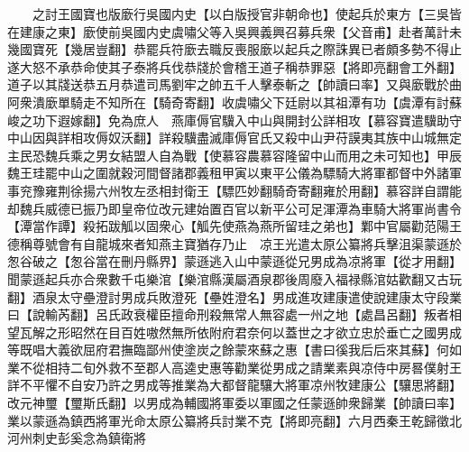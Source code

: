 　　之討王國寶也版廞行吳國内史【以白版授官非朝命也】使起兵於東方【三吳皆在建康之東】廞使前吳國内史虞嘯父等入吳興義興召募兵衆【父音甫】赴者萬計未幾國寶死【幾居豈翻】恭罷兵符廞去職反喪服廞以起兵之際誅異已者頗多勢不得止遂大怒不承恭命使其子泰將兵伐恭牋於會稽王道子稱恭罪惡【將即亮翻會工外翻】道子以其牋送恭五月恭遣司馬劉牢之帥五千人擊泰斬之【帥讀曰率】又與廞戰於曲阿衆潰廞單騎走不知所在【騎奇寄翻】收虞嘯父下廷尉以其祖潭有功【虞潭有討蘇峻之功下遐嫁翻】免為庶人　燕庫傉官驥入中山與開封公詳相攻【慕容寶遣驥助守中山因與詳相攻傉奴沃翻】詳殺驥盡滅庫傉官氏又殺中山尹苻謨夷其族中山城無定主民恐魏兵乘之男女結盟人自為戰【使慕容農慕容隆留中山而用之未可知也】甲辰魏王珪罷中山之圍就穀河間督諸郡義租甲寅以東平公儀為驃騎大將軍都督中外諸軍事兖豫雍荆徐揚六州牧左丞相封衛王【驃匹妙翻騎奇寄翻雍於用翻】慕容詳自謂能却魏兵威德已振乃即皇帝位改元建始置百官以新平公可足渾潭為車騎大將軍尚書令【潭當作譚】殺拓跋觚以固衆心【觚先使燕為燕所留珪之弟也】鄴中官屬勸范陽王德稱尊號會有自龍城來者知燕主寶猶存乃止　凉王光遣太原公纂將兵擊沮渠蒙遜於怱谷破之【怱谷當在刪丹縣界】蒙遜逃入山中蒙遜從兄男成為凉將軍【從才用翻】聞蒙遜起兵亦合衆數千屯樂涫【樂涫縣漢屬酒泉郡後周廢入福禄縣涫姑歡翻又古玩翻】酒泉太守壘澄討男成兵敗澄死【壘姓澄名】男成進攻建康遣使說建康太守段業曰【說輸芮翻】呂氏政衰權臣擅命刑殺無常人無容處一州之地【處昌呂翻】叛者相望瓦解之形昭然在目百姓嗷然無所依附府君奈何以蓋世之才欲立忠於垂亡之國男成等既唱大義欲屈府君撫臨鄙州使塗炭之餘蒙來蘇之惠【書曰徯我后后來其蘇】何如業不從相持二旬外救不至郡人高逵史惠等勸業從男成之請業素與凉侍中房晷僕射王詳不平懼不自安乃許之男成等推業為大都督龍驤大將軍凉州牧建康公【驤思將翻】改元神璽【璽斯氏翻】以男成為輔國將軍委以軍國之任蒙遜帥衆歸業【帥讀曰率】業以蒙遜為鎮西將軍光命太原公纂將兵討業不克【將即亮翻】六月西秦王乾歸徵北河州刺史彭奚念為鎮衛將

